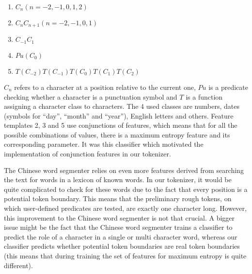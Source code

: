 \begin{enumerate}
  \item $C_n (n = -2,-1,0,1,2)$
  \item $C_n C_{n+1} (n = -2,-1,0,1)$
  \item $C_{-1} C_1$
  \item $Pu(C_0)$
  \item $T(C_{-2}) T(C_{-1}) T(C_0) T(C_1) T(C_2)$
\end{enumerate}

$C_n$ refers to a character at a position relative to the current one, $Pu$ is
a predicate checking whether a character is a punctuation symbol and $T$ is a
function assigning a character class to characters. The 4 used classes are
numbers, dates (symbols for ``day'', ``month'' and ``year''), English letters
and others. Feature templates 2, 3 and 5 use conjunctions of features, which
means that for all the possible combinations of values, there is a maximum
entropy feature and its corresponding parameter. It was this classifier which
motivated the implementation of conjunction features in our tokenizer.

The Chinese word segmenter relies on even more features derived from searching
the text for words in a lexicon of known words. In our tokenizer, it would be
quite complicated to check for these words due to the fact that every position
is a potential token boundary. This means that the preliminary rough tokens, on
which user-defined predicates are tested, are exactly one character long.
However, this improvement to the Chinese word segmenter is not that crucial. A
bigger issue might be the fact that the Chinese word segmenter trains a
classifier to predict the role of a character in a single or multi character
word, whereas our classifier predicts whether potential token boundaries are
real token boundaries (this means that during training the set of features for
maximum entropy is quite different).

